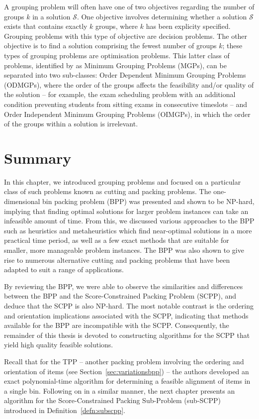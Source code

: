 \documentclass[a4paper,11pt]{article}
\begin{document}
\noindent A grouping problem will often have one of two objectives regarding the number of groups $k$ in a solution $\mathcal{S}$. One objective involves determining whether a solution $\mathcal{S}$ exists that contains exactly $k$ groups, where $k$ has been explicity specified. Grouping problems with this type of objective are decision problems. The other objective is to find a solution comprising the fewest number of groups $k$; these types of grouping problems are optimisation problems. This latter class of problems, identified by \citet{lewis2011} as Minimum Grouping Problems (MGPs), can be separated into two sub-classes: Order Dependent Minimum Grouping Problems (ODMGPs), where the order of the groups affects the feasibility and/or quality of the solution -- for example, the exam scheduling problem with an additional condition preventing students from sitting exams in consecutive timeslots -- and Order Independent Minimum Grouping Problems (OIMGPs), in which the order of the groups within a solution is irrelevant. 


\section{Summary}
\label{sec:litsummary}

\noindent In this chapter, we introduced grouping problems and focused on a particular class of such problems known as cutting and packing problems. The one-dimensional bin packing problem (BPP) was presented and shown to be NP-hard, implying that finding optimal solutions for larger problem instances can take an infeasible amount of time. From this, we discussed various approaches to the BPP such as heuristics and metaheuristics which find near-optimal solutions in a more practical time period, as well as a few exact methods that are suitable for smaller, more manageable problem instances. The BPP was also shown to give rise to numerous alternative cutting and packing problems that have been adapted to suit a range of applications.

By reviewing the BPP, we were able to observe the similarities and differences between the BPP and the Score-Constrained Packing Problem (SCPP), and deduce that the SCPP is also NP-hard. The most notable contrast is the ordering and orientation implications associated with the SCPP, indicating that methods available for the BPP are incompatible with the SCPP. Consequently, the remainder of this thesis is devoted to constructing algorithms for the SCPP that yield high quality feasible solutions.

Recall that for the TPP -- another packing problem involving the ordering and orientation of items (see Section~\ref{sec:variationsbpp}) -- the authors developed an exact polynomial-time algorithm for determining a feasible alignment of items in a single bin. Following on in a similar manner, the next chapter presents an algorithm for the Score-Constrained Packing Sub-Problem (sub-SCPP) introduced in Definition~\ref{defn:subscpp}.



\end{document}
